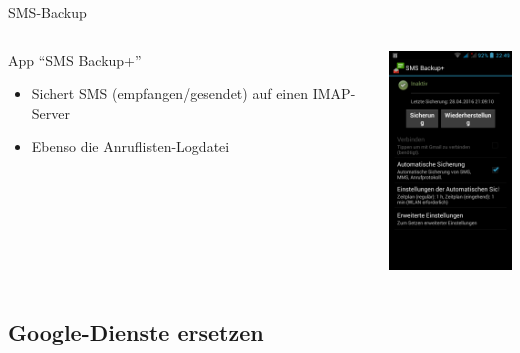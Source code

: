 \documentclass{beamer}
\begin{document}
\begin{frame}{SMS-Backup}
\begin{columns}[c]
  \begin{column}[T]{.7\textwidth}
      App "`SMS Backup+"'
    \begin{itemize}
      \item Sichert SMS (empfangen/gesendet) auf einen IMAP-Server
      \item Ebenso die Anruflisten-Logdatei
    
    \end{itemize}
  \end{column}
  \begin{column}[T]{.3\textwidth}
    \includegraphics[width=3.5cm]{sms.png} 
   \end{column}
\end{columns}
\end{frame}

\subsection{Google-Dienste ersetzen}
\end{document}
